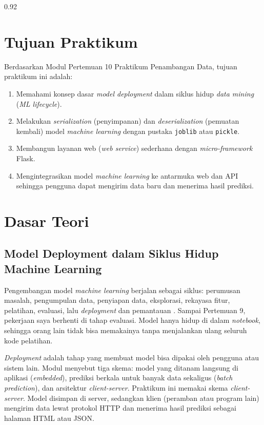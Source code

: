 \documentclass[a4paper,oneside,12pt]{report}
\begin{document}
\begin{spacing}{0.92}
	\tableofcontents
\end{spacing}
\clearpage

\setcounter{page}{3}

\chapter[Tujuan Praktikum]{Tujuan Praktikum}
Berdasarkan Modul Pertemuan 10 Praktikum Penambangan Data, tujuan praktikum ini adalah:
\begin{enumerate}[noitemsep, topsep=4pt, parsep=2pt]
	\item Memahami konsep dasar \textit{model deployment} dalam siklus hidup \textit{data mining} (\textit{ML lifecycle}).
	\item Melakukan \textit{serialization} (penyimpanan) dan \textit{deserialization} (pemuatan kembali) model \textit{machine learning} dengan pustaka \texttt{joblib} atau \texttt{pickle}.
	\item Membangun layanan web (\textit{web service}) sederhana dengan \textit{micro-framework} Flask.
	\item Mengintegrasikan model \textit{machine learning} ke antarmuka web dan API sehingga pengguna dapat mengirim data baru dan menerima hasil prediksi.
\end{enumerate}

\clearpage

\chapter{Dasar Teori}

\section{Model Deployment dalam Siklus Hidup Machine Learning}
Pengembangan model \textit{machine learning} berjalan sebagai siklus: perumusan masalah, pengumpulan data, penyiapan data, eksplorasi, rekayasa fitur, pelatihan, evaluasi, lalu \textit{deployment} dan pemantauan \cite{han2022}. Sampai Pertemuan 9, pekerjaan saya berhenti di tahap evaluasi. Model hanya hidup di dalam \textit{notebook}, sehingga orang lain tidak bisa memakainya tanpa menjalankan ulang seluruh kode pelatihan.

\textit{Deployment} adalah tahap yang membuat model bisa dipakai oleh pengguna atau sistem lain. Modul menyebut tiga skema: model yang ditanam langsung di aplikasi (\textit{embedded}), prediksi berkala untuk banyak data sekaligus (\textit{batch prediction}), dan arsitektur \textit{client-server}. Praktikum ini memakai skema \textit{client-server}. Model disimpan di server, sedangkan klien (peramban atau program lain) mengirim data lewat protokol HTTP dan menerima hasil prediksi sebagai halaman HTML atau JSON.
\end{document}
